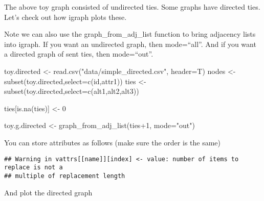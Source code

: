 \documentclass[
]{article}
\newenvironment{Shaded}{\begin{snugshade}}{\end{snugshade}}
\newcommand{\AttributeTok}[1]{\textcolor[rgb]{0.77,0.63,0.00}{#1}}
\newcommand{\DecValTok}[1]{\textcolor[rgb]{0.00,0.00,0.81}{#1}}
\newcommand{\FunctionTok}[1]{\textcolor[rgb]{0.00,0.00,0.00}{#1}}
\newcommand{\NormalTok}[1]{#1}
\newcommand{\OtherTok}[1]{\textcolor[rgb]{0.56,0.35,0.01}{#1}}
\newcommand{\SpecialCharTok}[1]{\textcolor[rgb]{0.00,0.00,0.00}{#1}}
\newcommand{\StringTok}[1]{\textcolor[rgb]{0.31,0.60,0.02}{#1}}
\begin{document}
The above toy graph consisted of undirected ties. Some graphs have
directed ties. Let's check out how igraph plots these.

Note we can also use the graph\_from\_adj\_list function to bring
adjacency lists into igraph. If you want an undirected graph, then
mode=``all''. And if you want a directed graph of sent ties, then
mode=``out''.

\begin{Shaded}
\begin{Highlighting}[]
\NormalTok{toy.directed }\OtherTok{\textless{}{-}} \FunctionTok{read.csv}\NormalTok{(}\StringTok{"data/simple\_directed.csv"}\NormalTok{, }\AttributeTok{header=}\NormalTok{T)  }
\NormalTok{nodes }\OtherTok{\textless{}{-}} \FunctionTok{subset}\NormalTok{(toy.directed,}\AttributeTok{select=}\FunctionTok{c}\NormalTok{(id,attr1))        }
\NormalTok{ties }\OtherTok{\textless{}{-}} \FunctionTok{subset}\NormalTok{(toy.directed,}\AttributeTok{select=}\FunctionTok{c}\NormalTok{(alt1,alt2,alt3))   }

\NormalTok{ties[}\FunctionTok{is.na}\NormalTok{(ties)] }\OtherTok{\textless{}{-}} \DecValTok{0}

\NormalTok{toy.g.directed }\OtherTok{\textless{}{-}} \FunctionTok{graph\_from\_adj\_list}\NormalTok{(ties}\SpecialCharTok{+}\DecValTok{1}\NormalTok{, }\AttributeTok{mode=}\StringTok{"out"}\NormalTok{)}
\end{Highlighting}
\end{Shaded}

You can store attributes as follows (make sure the order is the same)

\begin{Shaded}
\end{Shaded}

\begin{verbatim}
## Warning in vattrs[[name]][index] <- value: number of items to replace is not a
## multiple of replacement length
\end{verbatim}

And plot the directed graph

\begin{Shaded}
\end{Shaded}
\end{document}
